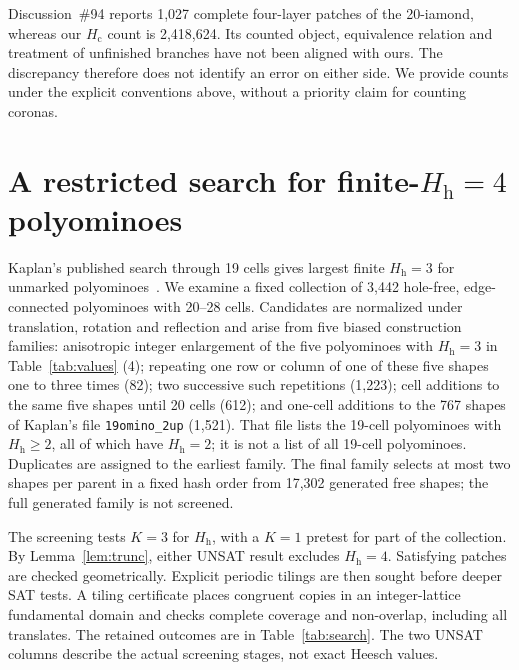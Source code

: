 \documentclass[10pt,a4paper]{article}
\theoremstyle{definition}
\theoremstyle{remark}
\newcommand{\Hc}{H_{\mathrm c}}
\newcommand{\Hh}{H_{\mathrm h}}
\begin{document}
Discussion~\#94 reports 1,027 complete four-layer patches of the
20-iamond, whereas our $\Hc$ count is 2,418,624. Its counted object,
equivalence relation and treatment of unfinished branches have not been
aligned with ours. The discrepancy therefore does not identify an error
on either side. We provide counts under the explicit conventions above,
without a priority claim for counting coronas.

\section{A restricted search for finite-\texorpdfstring{$\Hh=4$}{Hh=4} polyominoes}
\label{sec:search}
Kaplan's published search through 19 cells gives largest finite $\Hh=3$
for unmarked polyominoes~\cite{Kaplan}. We examine a fixed collection of
3,442 hole-free, edge-connected polyominoes with 20--28 cells. Candidates
are normalized under translation, rotation and reflection and arise from
five biased construction families: anisotropic integer enlargement of
the five polyominoes with $\Hh=3$ in Table~\ref{tab:values} (4);
repeating one row or column of one of these five shapes one to three
times (82); two successive such repetitions (1,223); cell additions to
the same five shapes until 20 cells (612); and one-cell additions to the
767 shapes of Kaplan's file \texttt{19omino\_2up} (1,521). That file
lists the 19-cell polyominoes with $\Hh\geq2$, all of which have
$\Hh=2$; it is not a list of all 19-cell polyominoes.
Duplicates are assigned to the earliest family. The final family selects
at most two shapes per parent in a fixed hash order from 17,302 generated
free shapes; the full generated family is not screened.

The screening tests $K=3$ for $\Hh$, with a $K=1$ pretest for part of
the collection. By Lemma~\ref{lem:trunc}, either UNSAT result excludes
$\Hh=4$. Satisfying patches are checked geometrically. Explicit periodic
tilings are then sought before deeper SAT tests. A tiling certificate
places congruent copies in an integer-lattice fundamental domain and
checks complete coverage and non-overlap, including all translates.
The retained outcomes are in Table~\ref{tab:search}. The two UNSAT
columns describe the actual screening stages, not exact Heesch values.
\end{document}
